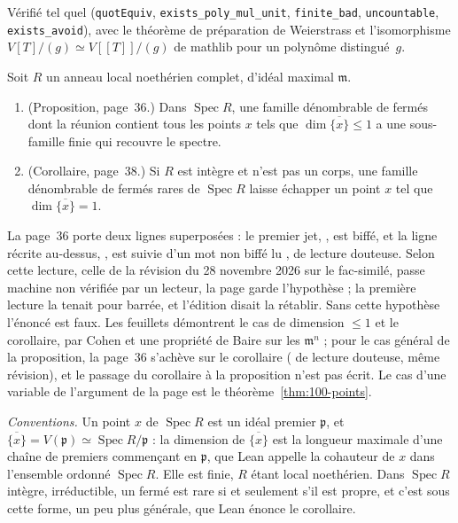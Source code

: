 \noindent Vérifié tel quel (\texttt{quotEquiv}, \texttt{exists\_poly\_mul\_unit}, \texttt{finite\_bad}, \texttt{uncountable}, \texttt{exists\_avoid}), avec le théorème de préparation de Weierstrass et l'isomorphisme $V[T]/(g) \simeq V[[T]]/(g)$ de mathlib pour un polynôme distingué~$g$.

\begin{encadre}
\begin{theoreme}\label{thm:100-baire}
Soit $R$ un anneau local noethérien complet, d'idéal maximal $\mathfrak m$.
\begin{enumerate}
\item (Proposition, page~36.) Dans $\operatorname{Spec} R$, une famille dénombrable de fermés dont la réunion contient tous les points $x$ tels que $\dim \overline{\{x\}} \leq 1$ a une sous-famille finie qui recouvre le spectre.
\item (Corollaire, page~38.) Si $R$ est intègre et n'est pas un corps, une famille dénombrable de fermés rares de $\operatorname{Spec} R$ laisse échapper un point $x$ tel que $\dim \overline{\{x\}} = 1$.
\end{enumerate}
\end{theoreme}
\end{encadre}
{\small La page~36 porte deux lignes superposées : le premier jet, , est biffé, et la ligne récrite au-dessus, , est suivie d'un mot non biffé lu , de lecture douteuse. Selon cette lecture, celle de la révision du 28 novembre 2026 sur le fac-similé, passe machine non vérifiée par un lecteur, la page garde l'hypothèse ; la première lecture la tenait pour barrée, et l'édition disait la rétablir. Sans cette hypothèse l'énoncé est faux. Les feuillets démontrent le cas de dimension $\leq 1$ et le corollaire, par Cohen et une propriété de Baire sur les $\mathfrak m^n$ ; pour le cas général de la proposition, la page~36 s'achève sur  le corollaire ( de lecture douteuse, même révision), et le passage du corollaire à la proposition n'est pas écrit. Le cas d'une variable de l'argument de la page est le théorème~\ref{thm:100-points}.\par}

\noindent\emph{Conventions.} Un point $x$ de $\operatorname{Spec} R$ est un idéal premier $\mathfrak p$, et $\overline{\{x\}} = V(\mathfrak p) \simeq \operatorname{Spec} R/\mathfrak p$ : la dimension de $\overline{\{x\}}$ est la longueur maximale d'une chaîne de premiers commençant en $\mathfrak p$, que Lean appelle la cohauteur de $x$ dans l'ensemble ordonné $\operatorname{Spec} R$. Elle est finie, $R$ étant local noethérien. Dans $\operatorname{Spec} R$ intègre, irréductible, un fermé est rare si et seulement s'il est propre, et c'est sous cette forme, un peu plus générale, que Lean énonce le corollaire.

